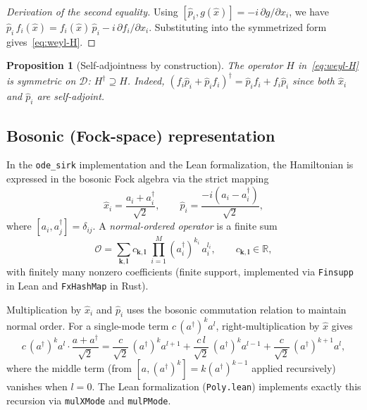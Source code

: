 \documentclass[11pt,a4paper]{article}
\newtheorem{proposition}[theorem]{Proposition}
\newcommand{\Rset}{\mathbb{R}}
\newcommand{\Dom}{\mathcal{D}}
\begin{document}
\begin{proof}[Derivation of the second equality]
Using $[\hat{p}_{i},g(\hat{x})]=-i\,\partial g/\partial x_{i}$, we have
$\hat{p}_{i}\,f_{i}(\hat{x})=f_{i}(\hat{x})\,\hat{p}_{i}
-i\,\partial f_{i}/\partial x_{i}$.  Substituting into the symmetrized
form gives~\eqref{eq:weyl-H}.
\end{proof}

\begin{proposition}[Self-adjointness by construction]
The operator $H$ in~\eqref{eq:weyl-H} is \emph{symmetric} on $\Dom$:
$H^{\dagger}\supseteq H$.  Indeed,
$(f_{i}\hat{p}_{i}+\hat{p}_{i}f_{i})^{\dagger}
=\hat{p}_{i}f_{i}+f_{i}\hat{p}_{i}$ since both $\hat{x}_{i}$ and
$\hat{p}_{i}$ are self-adjoint.
\end{proposition}

\subsection{Bosonic (Fock-space) representation}

In the \texttt{ode\_sirk} implementation and the Lean formalization, the
Hamiltonian is expressed in the bosonic Fock algebra via the strict
mapping
\begin{equation}\label{eq:bosonic}
  \hat{x}_{i}=\frac{a_{i}+a_{i}^{\dagger}}{\sqrt{2}},\qquad
  \hat{p}_{i}=\frac{-i(a_{i}-a_{i}^{\dagger})}{\sqrt{2}},
\end{equation}
where $[a_{i},a_{j}^{\dagger}]=\delta_{ij}$.  A \emph{normal-ordered
operator} is a finite sum
\begin{equation}
  \mathcal{O}=\sum_{\mathbf{k},\mathbf{l}}
    c_{\mathbf{k},\mathbf{l}}\;
    \prod_{i=1}^{M}(a_{i}^{\dagger})^{k_{i}}\,a_{i}^{l_{i}},
  \qquad c_{\mathbf{k},\mathbf{l}}\in\Rset,
\end{equation}
with finitely many nonzero coefficients (finite support, implemented via
\texttt{Finsupp} in Lean and \texttt{FxHashMap} in Rust).

Multiplication by $\hat{x}_{i}$ and $\hat{p}_{i}$ uses the bosonic
commutation relation to maintain normal order.  For a single-mode term
$c\,(a^{\dagger})^{k}a^{l}$, right-multiplication by $\hat{x}$ gives
\begin{equation}\label{eq:wick-x}
  c\,(a^{\dagger})^{k}a^{l}\cdot\frac{a+a^{\dagger}}{\sqrt{2}}
  =\frac{c}{\sqrt{2}}\,(a^{\dagger})^{k}a^{l+1}
  +\frac{c\,l}{\sqrt{2}}\,(a^{\dagger})^{k}a^{l-1}
  +\frac{c}{\sqrt{2}}\,(a^{\dagger})^{k+1}a^{l},
\end{equation}
where the middle term (from $[a,(a^{\dagger})^{k}]=k(a^{\dagger})^{k-1}$
applied recursively) vanishes when $l=0$.  The Lean formalization
(\texttt{Poly.lean}) implements exactly this recursion via
\texttt{mulXMode} and \texttt{mulPMode}.
\end{document}
